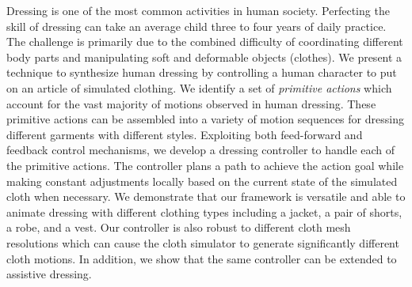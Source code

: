 \vspace{-0.125 in}
Dressing is one of the most common activities in human society. Perfecting
the skill of dressing can take an average child three to four years of
daily practice. The challenge is primarily due to the combined difficulty
of coordinating different body parts and manipulating soft and deformable
objects (clothes). We present a technique to synthesize human dressing by
controlling a human character to put on an article of simulated clothing.
We identify a set of \emph{primitive actions} which account for the vast
majority of motions observed in human dressing. These primitive actions
can be assembled into a variety of motion sequences for dressing different
garments with different styles. Exploiting both feed-forward and feedback
control mechanisms, we develop a dressing controller to handle each of the
primitive actions. The controller plans a path to achieve the action goal
while making constant adjustments locally based on the current state of
the simulated cloth when necessary. We demonstrate that our framework is
versatile and able to animate dressing with different clothing types
including a jacket, a pair of shorts, a robe, and a vest. Our controller
is also robust to different cloth mesh resolutions which can cause the
cloth simulator to generate significantly different cloth motions. In
addition, we show that the same controller can be extended to assistive
dressing.

